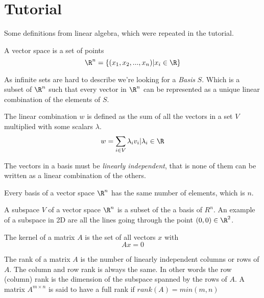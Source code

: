 \section*{Tutorial}
Some definitions from linear algebra, which were repeated in the tutorial.

\begin{Def} 
A vector space is a set of points $$\R^n=\{(x_1,x_2,...,x_n)|x_i \in \R\}$$
\end{Def}
 
As infinite sets are hard to describe we're looking for a \emph{Basis} $S$. Which is a subset of $\R^n$ such that every vector in $\R^n$ can be represented as a unique linear combination of the elements of $S$.

\begin{Def} 
The linear combination $w$ is defined as the sum of all the vectors in a set $V$ multiplied with some scalars $\lambda$.
$$w=\sum_{i \in V}{\lambda_i v_i} | \lambda_i \in \R$$ 
\end{Def} 

The vectors in a basis must be \emph{linearly independent}, that is none of them can be written as a linear combination of the others.

\begin{thm} 
Every basis of a vector space $\R^n$ has the same number of elements, which is $n$. 
\end{thm}

\begin{Def}[Subspace]
 A subspace $V$ of a vector space $\R^n$ is a subset of the a basis of $R^n$. An example of a subspace in 2D are all the lines going through the point $(0,0) \in \R^2$.
\end{Def}

\begin{Def} 
 The kernel of a matrix $A$ is the set of all vectors $x$ with
$$Ax=0$$
\end{Def}

\begin{Def}
 The rank of a matrix $A$ is the number of linearly independent columns or rows of $A$. The column and row rank is always the same. In other words the row (column) rank is the dimension of the subspace spanned by the rows of $A$. A matrix $A^{m \times n}$ is said to have a full rank if $rank(A)=min(m,n)$
\end{Def}



